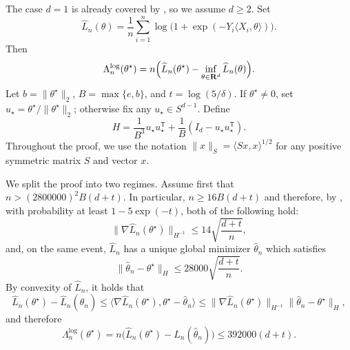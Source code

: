 \documentclass[11pt, letterpaper, hidelinks]{article}
\makeatletter
\renewcommand{\proofname}{\textit{\textbf{Proof}}}
\renewenvironment{proof}[1][\proofname]{\par\pushQED{\qed}\normalfont \topsep6\p@\@plus6\p@\relax\trivlist\item[\hskip\labelsep#1\@addpunct{}]\ignorespaces}{\popQED\endtrivlist\@endpefalse}
\newcommand{\R}{\mathbf R}
\newcommand{\1}{\mathbf 1}
\renewcommand{\le}{\leqslant}
\renewcommand{\geq}{\geqslant}
\newcommand{\T}{\mathsf{T}}
\theoremstyle{plain}
\theoremstyle{definition}
\newcommand{\thetastar}{\theta^\star}
\newcommand{\wh}{\widehat}
\newcommand{\defn}{=}
\makeatother
\begin{document}
\begin{proof}
The case $d=1$ is already covered by , so we assume $d \geq 2$. Set
\[
\widehat L_n(\theta)
\defn
\frac{1}{n}\sum_{i=1}^n \log\bigl(1+\exp(-Y_i\langle X_i,\theta\rangle)\bigr).
\]
Then
\[
\Lambda_n^{\operatorname{log}}(\thetastar)
=
n\Bigl(\widehat L_n(\thetastar)-\inf_{\theta \in \R^d}\widehat L_n(\theta)\Bigr).
\]
Let $b \defn \|\thetastar\|_2$, $B \defn \max\{e,b\}$, and $t \defn \log(5/\delta)$.
If $\thetastar \neq 0$, set $u_\star \defn \thetastar/\|\thetastar\|_2$; otherwise fix any
$u_\star \in S^{d-1}$. Define
\[
H
\defn
\frac{1}{B^3}u_\star u_\star^\T
+
\frac{1}{B}(I_d-u_\star u_\star^\T).
\]
Throughout the proof, we use the notation $\|x\|_S = \langle S x, x \rangle^{1/2}$ for any positive symmetric matrix $S$ and vector $x$.

We split the proof into two regimes. Assume first that $n > (2800000)^2 B(d+t)$.
In particular,
$n \geq 16B(d+t)$
and therefore, by \cite[Proposition~5, Theorem~6, Lemma~3, and Section~8.2]{chardon2024logistic}, with probability at least
$1-5\exp(-t)$, both of the following hold:
\[
\|\nabla \widehat L_n(\thetastar)\|_{H^{-1}}
\le
14\sqrt{\frac{d+t}{n}},
\]
and, on the same event, $\widehat L_n$ has a unique global minimizer
$\wh \theta_{n}$ which satisfies
\[
\|\wh \theta_{n}-\thetastar\|_H
\le
28000\sqrt{\frac{d+t}{n}}.
\]
By convexity of $\widehat L_n$, it holds that
\[
\widehat L_n(\thetastar)-\widehat L_n(\wh \theta_{n})
\le
\langle \nabla \widehat L_n(\thetastar), \thetastar-\wh \theta_{n}\rangle
\le
\|\nabla \widehat L_n(\thetastar)\|_{H^{-1}}
\|\wh \theta_{n}-\thetastar\|_H,
\]
and therefore
\[
\Lambda_n^{\operatorname{log}}(\thetastar)
=
n\bigl(\widehat L_n(\thetastar)-\widehat L_n(\wh \theta_{n})\bigr)
\le
392000(d+t).
\]


\end{proof}
\end{document}
